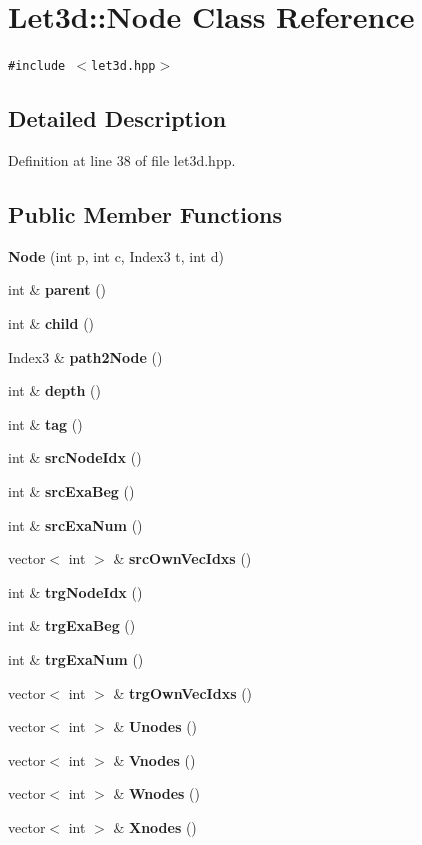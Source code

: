 \section{Let3d::Node Class Reference}
\label{classLet3d_1_1Node}
{\tt \#include $<$let3d.hpp$>$}



\subsection{Detailed Description}




Definition at line 38 of file let3d.hpp.\subsection*{Public Member Functions}
\begin{CompactItemize}
\item 
{\bf Node} (int p, int c, Index3 t, int d)
\item 
int \& {\bf parent} ()
\item 
int \& {\bf child} ()
\item 
Index3 \& {\bf path2Node} ()
\item 
int \& {\bf depth} ()
\item 
int \& {\bf tag} ()
\item 
int \& {\bf src\-Node\-Idx} ()
\item 
int \& {\bf src\-Exa\-Beg} ()
\item 
int \& {\bf src\-Exa\-Num} ()
\item 
vector$<$ int $>$ \& {\bf src\-Own\-Vec\-Idxs} ()
\item 
int \& {\bf trg\-Node\-Idx} ()
\item 
int \& {\bf trg\-Exa\-Beg} ()
\item 
int \& {\bf trg\-Exa\-Num} ()
\item 
vector$<$ int $>$ \& {\bf trg\-Own\-Vec\-Idxs} ()
\item 
vector$<$ int $>$ \& {\bf Unodes} ()
\item 
vector$<$ int $>$ \& {\bf Vnodes} ()
\item 
vector$<$ int $>$ \& {\bf Wnodes} ()
\item 
vector$<$ int $>$ \& {\bf Xnodes} ()
\end{CompactItemize}
